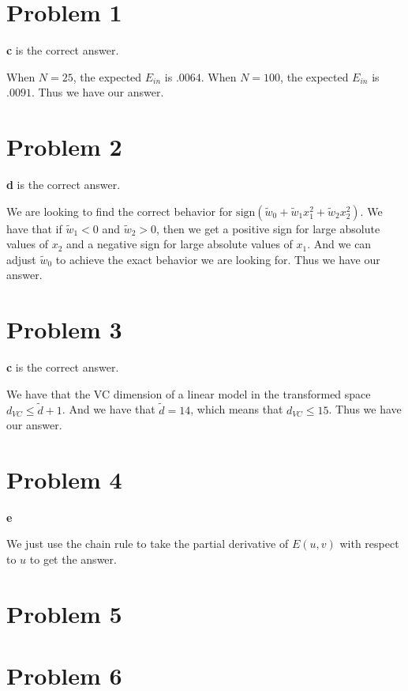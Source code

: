 \documentclass{article}
\begin{document}
\section*{Problem 1}
\textbf{c} is the correct answer.

\noindent When $N = 25$, the expected $E_{in}$ is $.0064$. When $N = 100$,
the expected $E_{in}$ is $.0091$. Thus we have our answer.

\section*{Problem 2}
\textbf{d} is the correct answer.

\noindent We are looking to find the correct behavior for
$\text{sign}(\tilde{w}_0 + \tilde{w}_1x_1^2 + \tilde{w}_2x_2^2)$. We have
that if $\tilde{w}_1 < 0$ and $\tilde{w}_2 > 0$, then we get a positive
sign for large absolute values of $x_2$ and a negative sign for large absolute
values of $x_1$. And we can adjust $\tilde{w}_0$ to achieve the exact
behavior we are looking for. Thus we have our answer.

\section*{Problem 3}
\textbf{c} is the correct answer.

\noindent We have that the VC dimension of a linear model in the transformed
space $d_{VC} \leq \tilde{d} + 1$. And we have that $\tilde{d} = 14$, which
means that $d_{VC} \leq 15$. Thus we have our answer.

\section*{Problem 4}
\textbf{e}

\noindent We just use the chain rule to take the partial derivative of
$E(u,v)$ with respect to $u$ to get the answer.

\section*{Problem 5}

\section*{Problem 6}
\end{document}
